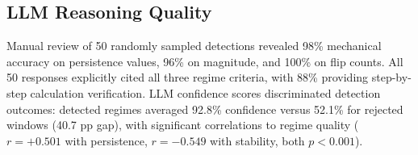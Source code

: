 \subsection{LLM Reasoning Quality}

Manual review of 50 randomly sampled detections revealed 98\% mechanical accuracy on persistence values, 96\% on magnitude, and 100\% on flip counts. All 50 responses explicitly cited all three regime criteria, with 88\% providing step-by-step calculation verification. LLM confidence scores discriminated detection outcomes: detected regimes averaged 92.8\% confidence versus 52.1\% for rejected windows (40.7 pp gap), with significant correlations to regime quality ($r = +0.501$ with persistence, $r = -0.549$ with stability, both $p < 0.001$).
